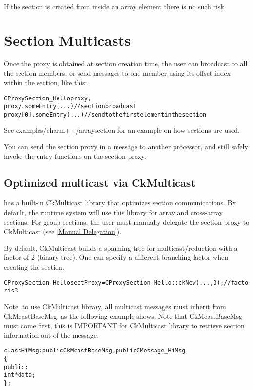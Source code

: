 If the section is created from inside an array element there is no such risk.

\section{Section Multicasts}
\label {array_section_multicast}

Once the proxy is obtained at section creation time, the user can broadcast to all the
section members, or send messages to one member using its offset index within the section, like this:

\begin{alltt}
  CProxySection_Hello proxy;
  proxy.someEntry(...)          // section broadcast
  proxy[0].someEntry(...)       // send to the first element in the section
\end{alltt}

See examples/charm++/arraysection for an example on how sections are used.

You can send the section proxy in a message to another processor, and still
safely invoke the entry functions on the section proxy.

\subsection{Optimized multicast via CkMulticast}

\charmpp{} has a built-in CkMulticast library that optimizes section communications.
By default, the \charmpp{} runtime system will use this library for array and cross-array sections. For group sections,
the user must manually delegate the section proxy to CkMulticast (see \ref{Manual Delegation}).

By default, CkMulticast builds a spanning tree for multicast/reduction
with a factor of 2 (binary tree). One can specify a different branching factor when creating the
section.
\begin{alltt}
  CProxySection_Hello sectProxy = CProxySection_Hello::ckNew(..., 3); // factor is 3
\end{alltt}

Note, to use CkMulticast library, all multicast messages must inherit from
CkMcastBaseMsg, as the following example shows.
Note that CkMcastBaseMsg must come first, this is IMPORTANT for CkMulticast
library to retrieve section information out of the message.


\begin{alltt}
class HiMsg : public CkMcastBaseMsg, public CMessage_HiMsg
\{
public:
  int *data;
\};
\end{alltt}

